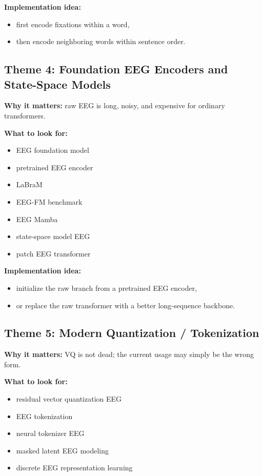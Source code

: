 \documentclass[11pt]{article}
\begin{document}
\textbf{Implementation idea:}
\begin{itemize}
    \item first encode fixations within a word,
    \item then encode neighboring words within sentence order.
\end{itemize}

\subsection{Theme 4: Foundation EEG Encoders and State-Space Models}

\textbf{Why it matters:} raw EEG is long, noisy, and expensive for ordinary transformers.

\textbf{What to look for:}
\begin{itemize}
    \item EEG foundation model
    \item pretrained EEG encoder
    \item LaBraM
    \item EEG-FM benchmark
    \item EEG Mamba
    \item state-space model EEG
    \item patch EEG transformer
\end{itemize}

\textbf{Implementation idea:}
\begin{itemize}
    \item initialize the raw branch from a pretrained EEG encoder,
    \item or replace the raw transformer with a better long-sequence backbone.
\end{itemize}

\subsection{Theme 5: Modern Quantization / Tokenization}

\textbf{Why it matters:} VQ is not dead; the current usage may simply be the wrong form.

\textbf{What to look for:}
\begin{itemize}
    \item residual vector quantization EEG
    \item EEG tokenization
    \item neural tokenizer EEG
    \item masked latent EEG modeling
    \item discrete EEG representation learning
\end{itemize}
\end{document}

